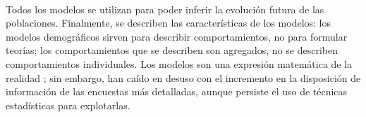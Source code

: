\documentclass[11pt,spanish,letterpaper]{article}
\theoremstyle{plain}
\begin{document}
\\
Todos los modelos se utilizan para poder inferir la evoluci\'on futura de las poblaciones. Finalmente, se describen las caracter\'isticas de los modelos: los modelos demogr\'aficos sirven para describir comportamientos, no para formular teor\'ias; los comportamientos que se describen son agregados, no se describen comportamientos individuales. Los modelos son una expresi\'on matem\'atica de la realidad ; sin embargo, han ca\'ido en desuso con el incremento en la disposici\'on de informaci\'on de las encuestas m\'as detalladas, aunque persiste el uso de t\'ecnicas estad\'isticas para explotarlas. 


\end{document}
